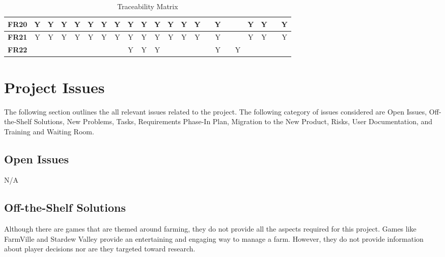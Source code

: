 \documentclass{article}
\begin{document}
\begin{table}[H]
\begin{adjustwidth}{-1.65in}{-1in}
{\begin{tabular}{c|c|c|c|c|c|c|c|c|c|c|c|c|c|c|c|c|c|c|c|c|c|}
\multicolumn{1}{|l|}{\textbf{FR20}} & Y            & Y            & Y            & Y            & Y            & Y            & Y            & Y            & Y            & Y            & Y            & Y            & Y            &              & Y            &              &              & Y            & Y           &             & Y           \\ \hline
\multicolumn{1}{|l|}{\textbf{FR21}} & Y            & Y            & Y            & Y            & Y            & Y            & Y            & Y            & Y            & Y            & Y            & Y            & Y            &              & Y            &              &              & Y            & Y           &             & Y           \\ \hline
\multicolumn{1}{|l|}{\textbf{FR22}} &              &              &              &              &              &              &              & Y            & Y            & Y            &              &              &              &              & Y            &              & Y            &              &             &             &             \\ \hline
\end{tabular}

}
\caption{Traceability Matrix}
    \label{tab:my_label}
\end{adjustwidth}
\end{table}

\section{Project Issues}
The following section outlines the all relevant issues related to the project. The following category of issues considered are Open Issues, Off-the-Shelf Solutions, New Problems, Tasks, Requirements Phase-In Plan, Migration to the New Product, Risks, User Documentation, and Training and Waiting Room.

\subsection{Open Issues}
N/A

\subsection{Off-the-Shelf Solutions}
Although there are games that are themed around farming, they do not provide all the aspects required for this project. Games like FarmVille and Stardew Valley provide an entertaining and engaging way to manage a farm. However, they do not provide information about player decisions nor are they targeted toward research. 
\end{document}
